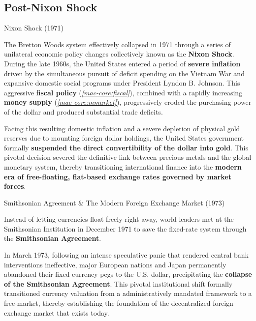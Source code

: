\documentclass[10pt]{article}
\begin{document}
  \subsection{Post-Nixon Shock}

    \begin{core}[label=core:nixon_shock]{Nixon Shock (1971)}

      The Bretton Woods system effectively collapsed in 1971 through a series of unilateral economic policy changes collectively known as the \textbf{Nixon Shock}. During the late 1960s, the United States entered a period of \textbf{severe inflation} driven by the simultaneous pursuit of deficit spending on the Vietnam War and expansive domestic social programs under President Lyndon B. Johnson. This aggressive \textbf{fiscal policy} (\textit{\autoref{mac-core:fiscal}}), combined with a rapidly increasing \textbf{money supply} (\textit{\autoref{mac-core:mmarket}}), progressively eroded the purchasing power of the dollar and produced substantial trade deficits.

      
      Facing this resulting domestic inflation and a severe depletion of physical gold reserves due to mounting foreign dollar holdings, the United States government formally \textbf{suspended the direct convertibility of the dollar into gold}. This pivotal decision severed the definitive link between precious metals and the global monetary system, thereby transitioning international finance into the \textbf{modern era of free-floating, fiat-based exchange rates governed by market forces}.

    \end{core}

    \begin{core}{Smithsonian Agreement \& The Modern Foreign Exchange Market (1973)}

      Instead of letting currencies float freely right away, world leaders met at the Smithsonian Institution in December 1971 to save the fixed-rate system through the \textbf{Smithsonian Agreement}.


      In March 1973, following an intense speculative panic that rendered central bank interventions ineffective, major European nations and Japan permanently abandoned their fixed currency pegs to the U.S. dollar, precipitating the \textbf{collapse of the Smithsonian Agreement}. This pivotal institutional shift formally transitioned currency valuation from a administratively mandated framework to a free-market, thereby establishing the foundation of the decentralized foreign exchange market that exists today.

    \end{core}
\end{document}
